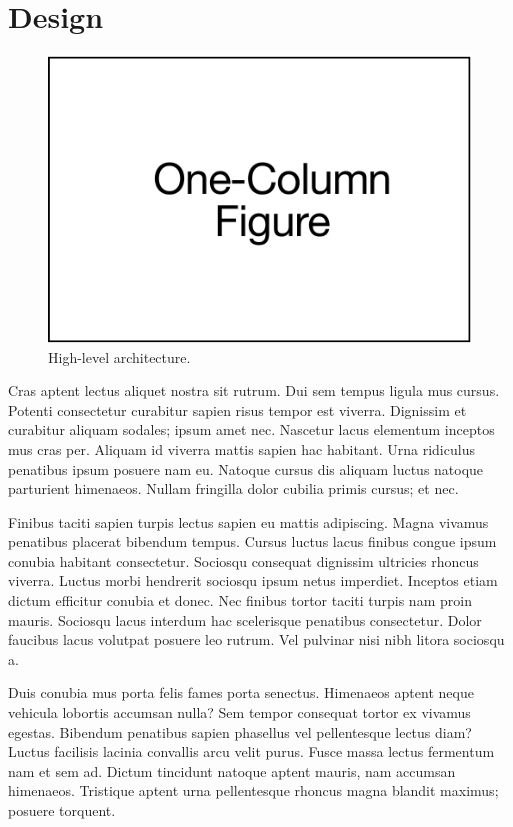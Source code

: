 \section{Design}
\label{sec:design}

\begin{figure}[t]
    \centering
    \includegraphics{diagrams/template.pdf}
    \caption{High-level architecture.}
    \label{fig:architecture}
\end{figure}

Cras aptent lectus aliquet nostra sit rutrum. Dui sem tempus ligula mus cursus.
Potenti consectetur curabitur sapien risus tempor est viverra. Dignissim et
curabitur aliquam sodales; ipsum amet nec. Nascetur lacus elementum inceptos
mus cras per. Aliquam id viverra mattis sapien hac habitant. Urna ridiculus
penatibus ipsum posuere nam eu. Natoque cursus dis aliquam luctus natoque
parturient himenaeos. Nullam fringilla dolor cubilia primis cursus; et nec.

Finibus taciti sapien turpis lectus sapien eu mattis adipiscing. Magna vivamus
penatibus placerat bibendum tempus. Cursus luctus lacus finibus congue ipsum
conubia habitant consectetur. Sociosqu consequat dignissim ultricies rhoncus
viverra. Luctus morbi hendrerit sociosqu ipsum netus imperdiet. Inceptos etiam
dictum efficitur conubia et donec. Nec finibus tortor taciti turpis nam proin
mauris. Sociosqu lacus interdum hac scelerisque penatibus consectetur. Dolor
faucibus lacus volutpat posuere leo rutrum. Vel pulvinar nisi nibh litora
sociosqu a.

Duis conubia mus porta felis fames porta senectus. Himenaeos aptent neque
vehicula lobortis accumsan nulla? Sem tempor consequat tortor ex vivamus
egestas. Bibendum penatibus sapien phasellus vel pellentesque lectus diam?
Luctus facilisis lacinia convallis arcu velit purus. Fusce massa lectus
fermentum nam et sem ad. Dictum tincidunt natoque aptent mauris, nam accumsan
himenaeos. Tristique aptent urna pellentesque rhoncus magna blandit maximus;
posuere torquent.

